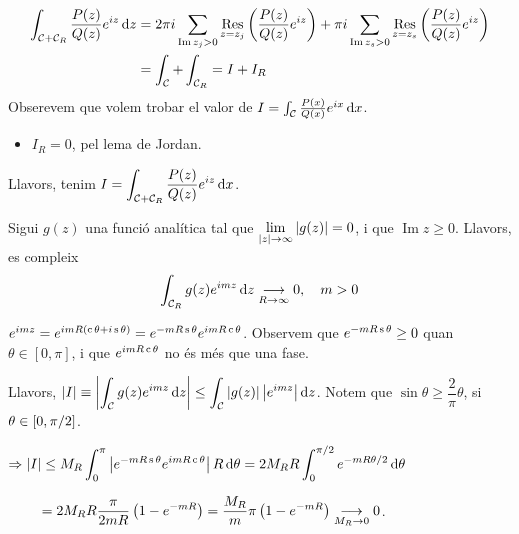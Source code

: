\begin{sproof}
    \begin{align*}
    \begin{aligned}
        \int_{\mathcal{C} + \mathcal{C}_{R}} \frac{P(z)}{Q(z)} e^{iz} \mathop{}\!\mathrm{d} z &= 2\pi i \sum_{\operatorname{Im}z_{j} > 0} \underset{z=z_{j}}{\operatorname{Res}} \left( \frac{P(z)}{Q(z)} e^{iz} \right) + \pi i \sum_{\operatorname{Im}z_{s} > 0} \underset{z=z_{s}}{\operatorname{Res}} \left( \frac{P(z)}{Q(z)} e^{iz} \right) \\
        &= \int_{\mathcal{C}} + \int_{\mathcal{C}_{R}} = I + I_{R}
    \end{aligned}
    \end{align*}
    Obserevem que volem trobar el valor de $I =\int_{\mathcal{C}} \frac{P(x)}{Q(x)} e^{ix} \mathop{}\!\mathrm{d} x$.
    \begin{itemize}
        \item $I_{R} = 0$, pel lema de Jordan.
    \end{itemize}
    Llavors, tenim $\displaystyle I = \int_{\mathcal{C} + \mathcal{C}_{R}} \frac{P(z)}{Q(z)} e^{iz} \mathop{}\!\mathrm{d} x$.
\end{sproof}

\begin{lem}[de Jordan]
    Sigui $g(z)$ una funció analítica tal que $\displaystyle \lim_{\left| z \right|\to \infty} \left| g(z) \right| = 0$, i que $\operatorname{Im} z \geq 0$. Llavors, es compleix
    \begin{align}
        \int_{\mathcal{C}_{R}} g(z) e^{imz} \mathop{}\!\mathrm{d} z \underset{R \to \infty}{\longrightarrow} 0, \quad m > 0
    \end{align}
\end{lem}
\begin{sproof}
    $e^{imz} = e^{imR(\operatorname{c} \theta + i \operatorname{s} \theta)} = e^{-mR\operatorname{s} \theta} e^{imR\operatorname{c} \theta}$. Observem que $e^{-mR\operatorname{s} \theta} \geq 0$ quan $\theta \in [0,\pi]$, i que $e^{imR\operatorname{c} \theta}$ no és més que una fase.

    Llavors, $\displaystyle \left| I \right| \equiv \left| \int_{\mathcal{C}} g(z) e^{imz} \mathop{}\!\mathrm{d} z \right| \leq \int_{\mathcal{C}} \left| g(z) \right| \left| e^{imz} \right| \mathop{}\!\mathrm{d} z$. Notem que $\sin \theta \geq \dfrac{2}{\pi} \theta$, si $\theta \in \left[ 0,\pi / 2 \right]$.

    $\Rightarrow \displaystyle \left| I \right| \leq M_{R} \int_{0}^{\pi} \left| e^{-mR\operatorname{s} \theta} e^{imR\operatorname{c} \theta} \right| R \mathop{}\!\mathrm{d} \theta = 2 M_{R} R \int_{0}^{\pi/2} e^{-mR\theta /2} \mathop{}\!\mathrm{d} \theta$

    $\phantom{\Rightarrow} \displaystyle \phantom{\abs{I}} = 2 M_{R} R \dfrac{\pi}{2mR} \lrpar{1 - e^{-mR}} = \dfrac{M_{R}}{m} \pi \lrpar{1 - e^{-mR}} \underset{M_{R} \to 0}{\longrightarrow} 0$.
\end{sproof}
